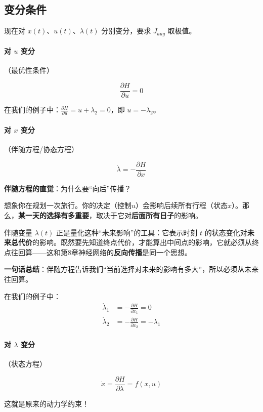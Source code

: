 \subsection{变分条件}

现在对 $x(t)$、$u(t)$、$\lambda(t)$ 分别变分，要求 $J_{aug}$ 取极值。

\paragraph{对 $u$ 变分}（最优性条件）

\[
\frac{\partial H}{\partial u} = 0
\]

在我们的例子中：$\frac{\partial H}{\partial u} = u + \lambda_2 = 0$，即 $u = -\lambda_2$。

\paragraph{对 $x$ 变分}（伴随方程/协态方程）

\[
\dot{\lambda} = -\frac{\partial H}{\partial x}
\]

\begin{insightbox}
\textbf{伴随方程的直觉}：为什么要“向后”传播？

想象你在规划一次旅行。你的决定（控制$u$）会影响后续所有行程（状态$x$）。那么，\textbf{某一天的选择有多重要}，取决于它对\textbf{后面所有日子}的影响。

伴随变量 $\lambda(t)$ 正是量化这种“未来影响”的工具：它表示时刻 $t$ 的状态变化对\textbf{未来总代价}的影响。既然要先知道终点代价，才能算出中间点的影响，它就必须从终点往回算——这和第8章神经网络的\textbf{反向传播}是同一个思想。

\textbf{一句话总结}：伴随方程告诉我们“当前选择对未来的影响有多大”，所以必须从未来往回算。
\end{insightbox}

在我们的例子中：
\begin{align}
\dot{\lambda}_1 &= -\frac{\partial H}{\partial x_1} = 0 \\
\dot{\lambda}_2 &= -\frac{\partial H}{\partial x_2} = -\lambda_1
\end{align}

\paragraph{对 $\lambda$ 变分}（状态方程）

\[
\dot{x} = \frac{\partial H}{\partial \lambda} = f(x, u)
\]

这就是原来的动力学约束！

